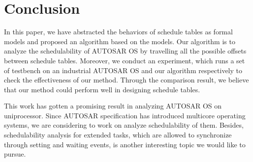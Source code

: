 \documentclass[conference]{IEEEtran}
\begin{document}
\section{Conclusion}
In this paper, we have abstracted the behaviors of schedule tables as formal models and proposed an algorithm based on the models. Our algorithm is to analyze the schedulability of AUTOSAR OS by travelling all the possible offsets between schedule tables. Moreover, we conduct an experiment, which runs a set of testbench on an industrial AUTOSAR OS and our algorithm respectively to check the effectiveness of our method. Through the comparison result, we believe that our method could perform well in designing schedule tables.
 
This work has gotten a promising result in analyzing AUTOSAR OS on uniprocessor. Since AUTOSAR specification has introduced multicore operating systems, we are considering to work on analyze schedulability of them. Besides, schedulability analysis for extended tasks, which are allowed to synchronize through setting and waiting events, is another interesting topic we would like to pursue.








\end{document}
